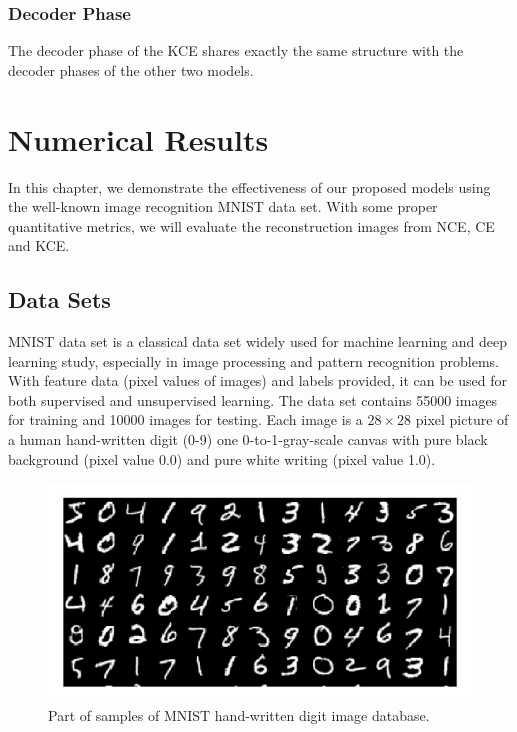 \documentclass[12pt]{report} %
\begin{document}
\subsection{Decoder Phase}
The decoder phase of the KCE shares exactly the same structure with the decoder phases of the other two models. 

\chapter{Numerical Results}
In this chapter, we demonstrate the effectiveness of our proposed models using the well-known image recognition MNIST data set. With some proper quantitative metrics, we will evaluate the reconstruction images from NCE, CE and KCE. 
\section{Data Sets}
MNIST data set\cite{MNIST} is a classical data set widely used for machine learning and deep learning study, especially in image processing and pattern recognition problems. With feature data (pixel values of images) and labels provided, it can be used for both supervised and unsupervised learning. The data set contains 55000 images for training and 10000 images for testing. Each image is a $28 \times 28$ pixel picture of a human hand-written digit (0-9) one 0-to-1-gray-scale canvas with pure black background (pixel value 0.0) and pure white writing (pixel value 1.0).
\begin{figure}[H]
	\centering
	\includegraphics[scale=2.0]{pictures/MNIST.png}
	\caption{Part of samples of MNIST hand-written digit image database\cite{MNISTPIC}.}
	\label{fig:1}
\end{figure}
\end{document}
